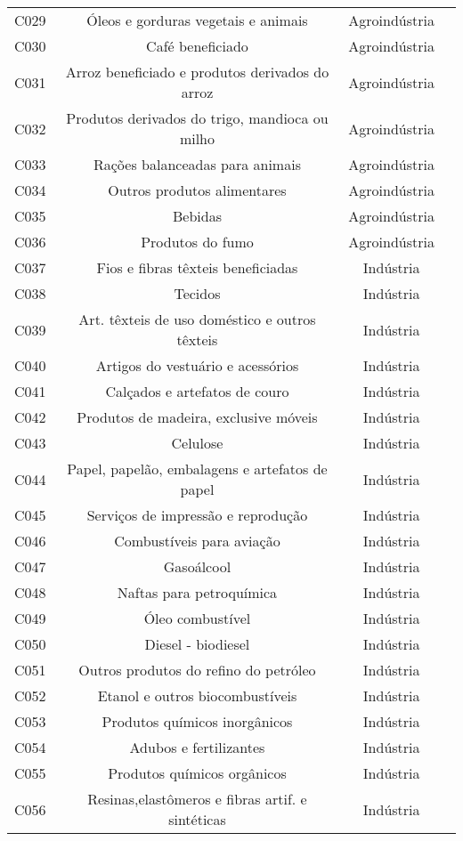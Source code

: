 \begin{apendicesenv}
\begin{small}
\begin{center}
\begin{longtable}{lccc}
				C029 & Óleos e gorduras vegetais e animais & Agroindústria \\
				C030 & Café beneficiado & Agroindústria \\
				C031 & Arroz beneficiado e produtos derivados do arroz & Agroindústria \\
				C032 & Produtos derivados do trigo, mandioca ou milho & Agroindústria \\
				C033 & Rações balanceadas para animais & Agroindústria \\
				C034 & Outros produtos alimentares & Agroindústria \\
				C035 & Bebidas & Agroindústria \\
				C036 & Produtos do fumo & Agroindústria \\
				C037 & Fios e fibras têxteis beneficiadas & Indústria \\
				C038 & Tecidos & Indústria \\
				C039 & Art. têxteis de uso doméstico e outros têxteis & Indústria \\
				C040 & Artigos do vestuário e acessórios & Indústria \\
				C041 & Calçados e artefatos de couro & Indústria \\
				C042 & Produtos de madeira, exclusive móveis & Indústria \\
				C043 & Celulose & Indústria \\
				C044 & Papel, papelão, embalagens e artefatos de papel & Indústria \\
				C045 & Serviços de impressão e reprodução & Indústria \\
				C046 & Combustíveis para aviação & Indústria \\
				C047 & Gasoálcool & Indústria \\
				C048 & Naftas para petroquímica & Indústria \\
				C049 & Óleo combustível & Indústria \\
				C050 & Diesel - biodiesel & Indústria \\
				C051 & Outros produtos do refino do petróleo & Indústria \\
				C052 & Etanol e outros biocombustíveis & Indústria \\
				C053 & Produtos químicos inorgânicos & Indústria \\
				C054 & Adubos e fertilizantes & Indústria \\
				C055 & Produtos químicos orgânicos & Indústria \\
				C056 & Resinas,elastômeros e fibras artif. e sintéticas & Indústria \\

\end{longtable}
\end{center}
\end{small}
\end{apendicesenv}
